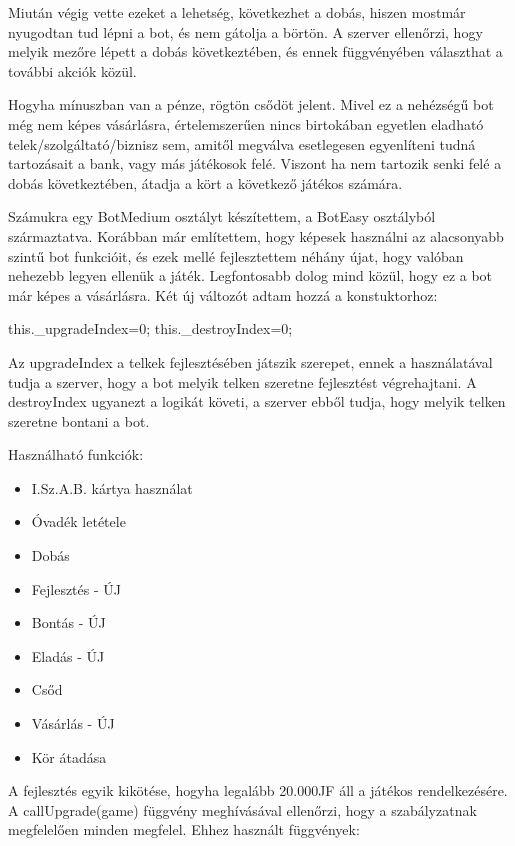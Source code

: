 Miután végig vette ezeket a lehetség, következhet a dobás, hiszen mostmár nyugodtan tud lépni a bot, és nem gátolja a börtön. A szerver ellenőrzi, hogy melyik mezőre lépett a dobás következtében, és ennek függvényében választhat a további akciók közül.

Hogyha mínuszban van a pénze, rögtön csődöt jelent. Mivel ez a nehézségű bot még nem képes vásárlásra, értelemszerűen nincs birtokában egyetlen eladható  telek/szolgáltató/biznisz sem, amitől megválva esetlegesen egyenlíteni tudná tartozásait a bank, vagy más játékosok felé. Viszont ha nem tartozik senki felé a dobás következtében, átadja a kört a következő játékos számára. 



Számukra egy BotMedium osztályt készítettem, a BotEasy osztályból származtatva. Korábban már említettem, hogy képesek használni az alacsonyabb szintű bot funkcióit, és ezek mellé fejlesztettem néhány újat, hogy valóban nehezebb legyen ellenük a játék. Legfontosabb dolog mind közül, hogy ez a bot már képes a vásárlásra. Két új változót adtam hozzá a konstuktorhoz:

\begin{javascript}
        this._upgradeIndex=0;
        this._destroyIndex=0;
\end{javascript}

Az upgradeIndex a telkek fejlesztésében játszik szerepet, ennek a használatával tudja a szerver, hogy a bot melyik telken szeretne fejlesztést végrehajtani. A destroyIndex ugyanezt a logikát követi, a szerver ebből tudja, hogy melyik telken szeretne bontani a bot.


Használható funkciók:

\begin{itemize}
\item I.Sz.A.B. kártya használat
\item Óvadék letétele
\item Dobás
\item Fejlesztés - ÚJ
\item Bontás - ÚJ
\item Eladás - ÚJ
\item Csőd
\item Vásárlás - ÚJ
\item Kör átadása
\end{itemize}

A fejlesztés egyik kikötése, hogyha legalább 20.000JF áll a játékos rendelkezésére. A callUpgrade(game) függvény meghívásával ellenőrzi, hogy a szabályzatnak megfelelően minden megfelel. Ehhez használt függvények:

